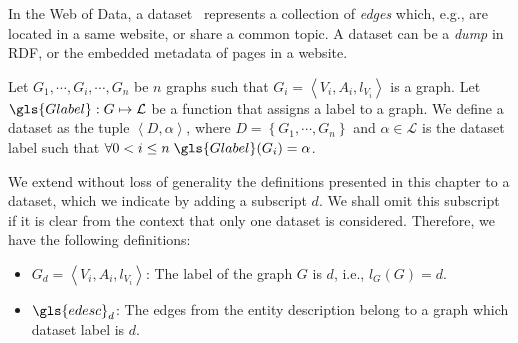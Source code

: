 In the Web of Data, a dataset~\cite{alexander:2009:dld} represents a collection of \emph{edges} which, e.g., are located in a same website, or share a common topic. A dataset can be a \emph{dump} in RDF, or the embedded metadata of pages in a website.

\begin{definition}[Dataset]
Let $G_1, \cdots, G_i, \cdots, G_n$ be $n$ graphs such that $G_i = \left\langle V_i, A_i, l_{V_i} \right\rangle$ is a graph.
Let $\gls{Glabel} : G \mapsto \mathcal{L}$ be a function that assigns a label to a graph.
We define a dataset as the tuple $\left\langle D, \alpha \right\rangle$, where $D = \left\lbrace G_1, \cdots, G_n \right\rbrace$ and $\alpha \in \mathcal{L}$ is the dataset label such that $\forall 0 < i \le n\; \gls{Glabel}(G_i) = \alpha$.
\end{definition}

We extend without loss of generality the definitions presented in this chapter to a dataset, which we indicate by adding a subscript $d$. We shall omit this subscript if it is clear from the context that only one dataset is considered. Therefore, we have the following definitions:

\begin{itemize}
\item $G_d = \left\langle V_i, A_i, l_{V_i} \right\rangle$: The label of the graph $G$ is $d$, i.e., $l_G(G) = d$.
\item $\gls{edesc}_d$: The edges from the entity description belong to a graph which dataset label is $d$.
\end{itemize}

